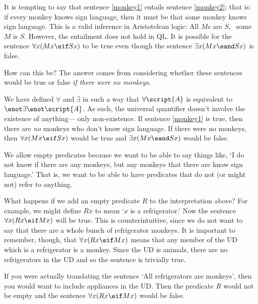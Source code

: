 It is tempting to say that sentence \ref{monkey1} entails sentence \ref{monkey2}; that is: if every monkey knows sign language, then it must be that some monkey knows sign language. This is a valid inference in Aristotelean logic: All $M$s are $S$, \therefore\ some $M$ is $S$. However, the entailment does not hold in QL. It is possible for the sentence $\forall x(Mx \eif Sx)$ to be true even though the sentence $\exists x(Mx \eand Sx)$ is false.

How can this be? The answer comes from considering whether these sentences would be true or false \emph{if there were no monkeys}.

We have defined $\forall$ and $\exists$ in such a way that $\forall\script{A}$ is equivalent to $\enot \exists\enot \script{A}$. As such, the universal quantifier doesn't involve the existence of anything--- only non-existence. If sentence \ref{monkey1} is true, then there are \emph{no} monkeys who don't know sign language. If there were no monkeys, then $\forall x(Mx \eif Sx)$ would be true and $\exists x(Mx \eand Sx)$ would be false.

We allow empty predicates because we want to be able to say things like, `I do not know if there are any monkeys, but any monkeys that there are know sign language.' That is, we want to be able to have predicates that do not (or might not) refer to anything.


What happens if we add an empty predicate $R$ to the interpretation above? For example, we might define $Rx$ to mean `$x$ is a refrigerator.' Now the sentence $\forall x(Rx \eif Mx)$ will be true. This is counterintuitive, since we do not want to say that there are a whole bunch of refrigerator monkeys. It is important to remember, though, that $\forall x(Rx \eif Mx)$ means that any member of the UD which is a refrigerator is a monkey. Since the UD is animals, there are no refrigerators in the UD and so the sentence is trivially true.

If you were actually translating the sentence `All refrigerators are monkeys', then you would want to include appliances in the UD. Then the predicate $R$ would not be empty and the sentence $\forall x(Rx \eif Mx)$ would be false.

